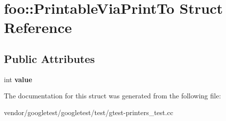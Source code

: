 \hypertarget{structfoo_1_1_printable_via_print_to}{}\section{foo\+:\+:Printable\+Via\+Print\+To Struct Reference}
\label{structfoo_1_1_printable_via_print_to}
\subsection*{Public Attributes}
\begin{DoxyCompactItemize}
\item 
\mbox{\label{structfoo_1_1_printable_via_print_to_a16f8c6420275d86f0d0112ca5a41bca2}} 
int {\bfseries value}
\end{DoxyCompactItemize}


The documentation for this struct was generated from the following file\+:\begin{DoxyCompactItemize}
\item 
vendor/googletest/googletest/test/gtest-\/printers\+\_\+test.\+cc\end{DoxyCompactItemize}
